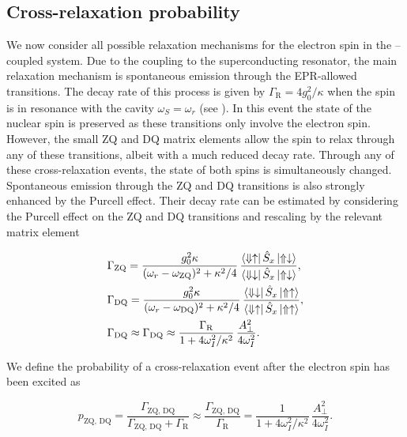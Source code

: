 \subsection{Cross-relaxation probability}

We now consider all possible relaxation mechanisms for the electron spin in the \W--\Er coupled system. Due to the coupling to the superconducting resonator, the main relaxation mechanism is spontaneous emission through the EPR-allowed transitions. The decay rate of this process is given by $\Gamma_\text{R}=4g_0^2/\kappa$ when the spin is in resonance with the cavity $\omega_S = \omega_r$ (see ). In this event the state of the nuclear spin is preserved as these transitions only involve the electron spin. However, the small ZQ and DQ matrix elements allow the \Er spin to relax through any of these transitions, albeit with a much reduced decay rate. Through any of these cross-relaxation events, the state of both spins is simultaneously changed. Spontaneous emission through the ZQ and DQ transitions is also strongly enhanced by the Purcell effect. Their decay rate can be estimated by considering the Purcell effect on the ZQ and DQ transitions and rescaling by the relevant matrix element

\begin{align}
\begin{split}
    &\Gamma_\text{ZQ} = \frac{g_0^2\kappa}{(\omega_r-\omega_\text{ZQ})^2 + \kappa^2/4} \, \frac{\bra{\Downarrow \uparrow}\hat{S}_x \ket{\Uparrow \downarrow}}{\bra{\Downarrow \downarrow}\hat{S}_x \ket{\Uparrow \downarrow}}, \\
    &\Gamma_\text{DQ} = \frac{g_0^2\kappa}{(\omega_r-\omega_\text{DQ})^2 + \kappa^2/4} \, \frac{\bra{\Downarrow \downarrow}\hat{S}_x \ket{\Uparrow \uparrow}}{\bra{\Downarrow \uparrow}\hat{S}_x \ket{\Uparrow \uparrow}}, \\
    &\Gamma_\text{DQ} \approx \Gamma_\text{DQ} \approx \frac{\Gamma_\text{R}}{1 + 4\omega_I^2 / \kappa^2} \, \frac{A_\perp^2}{4\omega_I^2}.
\end{split}
\end{align}

We define the probability of a cross-relaxation event after the electron spin has been excited as

\begin{equation}
    \label{eq:cross_relaxation_probability_half}
    p_\text{ZQ, DQ} = \frac{\Gamma_\text{ZQ, DQ}}{\Gamma_\text{ZQ, DQ} + \Gamma_\text{R}} \approx  \frac{\Gamma_\text{ZQ, DQ}}{\Gamma_\text{R}} = \frac{1}{1 + 4\omega_I^2 / \kappa^2} \, \frac{A_\perp^2}{4\omega_I^2}.
\end{equation}

